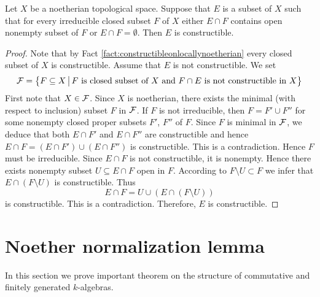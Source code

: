 \begin{proposition}\label{proposition:criterionofconstructiblenoetherian}
Let $X$ be a noetherian topological space. Suppose that $E$ is a subset of $X$ such that for every irreducible closed subset $F$ of $X$ either $E\cap F$ contains open nonempty subset of $F$ or $E\cap F = \emptyset$. Then $E$ is constructible.
\end{proposition}
\begin{proof}
Note that by Fact \ref{fact:constructibleonlocallynoetherian} every closed subset of $X$ is constructible. Assume that $E$ is not constructible. We set
$${\mathcal F} = \big\{F\subseteq X\,\big|\,F\mbox{ is closed subset of }X\mbox{ and }F\cap E\mbox{ is not constructible in }X\big\}$$
First note that $X\in {\mathcal F}$. Since $X$ is noetherian, there exists the minimal (with respect to inclusion) subset $F$ in ${\mathcal F}$. If $F$ is not irreducible, then $F = F'\cup F''$ for some nonempty closed proper subsets $F'$, $F''$ of $F$. Since $F$ is minimal in ${\mathcal F}$, we deduce that both $E\cap F'$ and $E\cap F''$ are constructible and hence $E\cap F  = \left(E\cap F'\right)\cup \left(E\cap F''\right)$ is constructible. This is a contradiction. Hence $F$ must be irreducible. Since $E\cap F$ is not constructible, it is nonempty. Hence there exists nonempty subset $U\subseteq E\cap F$ open in $F$. According to $F\setminus U \subset F$ we infer that $E\cap \left(F\setminus U\right)$ is constructible. Thus
$$E\cap F = U\cup \left(E\cap \left(F\setminus U\right)\right)$$
is constructible. This is a contradiction. Therefore, $E$ is constructible.
\end{proof}

\section{Noether normalization lemma}
\noindent
In this section we prove important theorem on the structure of commutative and finitely generated $k$-algebras.


